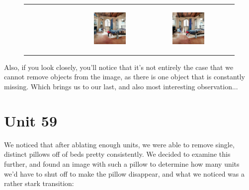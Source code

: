 \documentclass{article}
\begin{document}
\begin{figure}[H]
\begin{tabular}{c c c c}
\begin{subfigure}[h!]{0.25\textwidth}
    \end{subfigure} &
     \begin{subfigure}[h!]{0.25\textwidth}
        \includegraphics[scale=0.35]{images/a3.png}
    \end{subfigure} &
     \begin{subfigure}[h!]{0.25\textwidth}
        \includegraphics[scale=0.35]{images/a4.png}
    \end{subfigure} \\
    \end{tabular}
\end{figure}

Also, if you look closely, you'll notice that it's not entirely the case that we cannot remove objects from the image, as there is one object that is constantly missing. Which brings us to our last, and also most interesting observation...
\section{Unit 59}
We noticed that after ablating enough units, we were able to remove single, distinct pillows off of beds pretty consistently. We decided to examine this further, and found an image with such a pillow to determine how many units we'd have to shut off to make the pillow disappear, and what we noticed was a rather stark transition:
\end{document}

